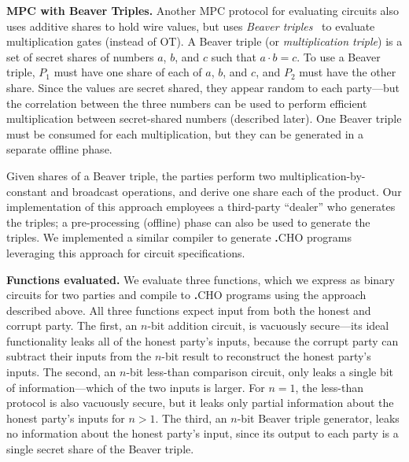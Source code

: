 \documentclass[compsoc, conference, a4paper, 10pt, times]{IEEEtran}
\renewcommand{\paragraph}[1]{\vspace*{2pt}\noindent\textbf{#1}}
\newcommand{\langname}{\textsc{\textbf{.}CHO}\xspace}
\begin{document}
\paragraph{MPC with Beaver Triples.}
Another MPC protocol for evaluating circuits also uses additive shares to hold wire values, but uses \emph{Beaver triples}~\cite{beaver1992efficient} to evaluate multiplication gates (instead of OT). A Beaver triple (or \emph{multiplication triple}) is a set of secret shares of numbers $a$, $b$, and $c$ such that $a \cdot b = c$. To use a Beaver triple, $P_1$ must have one share of each of $a$, $b$, and $c$, and $P_2$ must have the other share. Since the values are secret shared, they appear random to each party---but the correlation between the three numbers can be used to perform efficient multiplication between secret-shared numbers (described later). One Beaver triple must be consumed for each multiplication, but they can be generated in a separate offline phase.

Given shares of a Beaver triple, the parties perform two multiplication-by-constant and broadcast operations, and derive one share each of the product. Our implementation of this approach employees a third-party ``dealer'' who generates the triples; a pre-processing (offline) phase can also be used to generate the triples. We implemented a similar compiler to generate \langname programs leveraging this approach for circuit specifications.


\paragraph{Functions evaluated.}
We evaluate three functions, which we express as binary circuits for two parties and compile to \langname programs using the approach described above. All three functions expect input from both the honest and corrupt party. The first, an $n$-bit addition circuit, is vacuously secure---its ideal functionality leaks all of the honest party's inputs, because the corrupt party can subtract their inputs from the $n$-bit result to reconstruct the honest party's inputs. The second, an $n$-bit less-than comparison circuit, only leaks a single bit of information---which of the two inputs is larger. For $n=1$, the less-than protocol is also vacuously secure, but it leaks only partial information about the honest party's inputs for $n>1$. The third, an $n$-bit Beaver triple generator, leaks no information about the honest party's input, since its output to each party is a single secret share of the Beaver triple.
\end{document}
